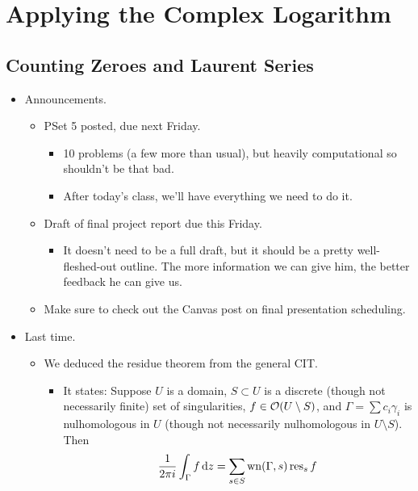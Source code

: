 \documentclass[../notes.tex]{subfiles}
\begin{document}
\chapter{Applying the Complex Logarithm}
\section{Counting Zeroes and Laurent Series}
\begin{itemize}
    \item {}Announcements.
    \begin{itemize}
        \item PSet 5 posted, due next Friday.
        \begin{itemize}
            \item 10 problems (a few more than usual), but heavily computational so shouldn't be that bad.
            \item After today's class, we'll have everything we need to do it.
        \end{itemize}
        \item Draft of final project report due this Friday.
        \begin{itemize}
            \item It doesn't need to be a full draft, but it should be a pretty well-fleshed-out outline. The more information we can give him, the better feedback he can give us.
        \end{itemize}
        \item Make sure to check out the Canvas post on final presentation scheduling.
    \end{itemize}
    \item Last time.
    \begin{itemize}
        \item We deduced the residue theorem from the general CIT.
        \begin{itemize}
            \item It states: Suppose $U$ is a domain, $S\subset U$ is a discrete (though not necessarily finite) set of singularities, $f\in\mathcal{O}(U\setminus S)$, and $\Gamma=\sum c_i\gamma_i$ is nulhomologous in $U$ (though not necessarily nulhomologous in $U\setminus S$). Then
            \begin{equation*}
                \frac{1}{2\pi i}\int_\Gamma f\dd{z} = \sum_{s\in S}\operatorname{wn}(\Gamma,s)\operatorname{res}_sf
            \end{equation*}
        \end{itemize}

\end{itemize}
\end{itemize}
\end{document}
